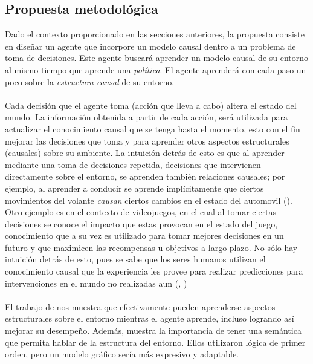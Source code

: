 \documentclass[11pt]{article}
\theoremstyle{plain}
\begin{document}
\subsection{Propuesta metodológica}
Dado el contexto proporcionado en las secciones anteriores, la propuesta consiste en diseñar un agente que incorpore un modelo causal dentro a un problema de toma de decisiones. Este agente buscará aprender un modelo causal de su entorno al mismo tiempo que aprende una \textit{política}. El agente aprenderá con cada paso un poco sobre la \textit{estructura causal} de su entorno.\\
\\
Cada decisión que el agente toma (acción que lleva a cabo) altera el estado del mundo. La información obtenida a partir de cada acción, será utilizada para actualizar el conocimiento causal que se tenga hasta el momento, esto con el fin mejorar las decisiones que toma y para aprender otros aspectos estructurales (causales) sobre su ambiente. La intuición detrás de esto es que al aprender mediante una toma de decisiones repetida, decisiones que intervienen directamente sobre el entorno, se aprenden también relaciones causales; por ejemplo, al aprender a conducir se aprende implícitamente que ciertos movimientos del volante \textit{causan} ciertos cambios en el estado del automovil (\cite{danks2014unifying}). Otro ejemplo es en el contexto de videojuegos, en el cual al tomar ciertas decisiones se conoce el impacto que estas provocan en el estado del juego, conocimiento que a su vez es utilizado para tomar mejores decisiones en un futuro y que maximicen las recompensas u objetivos a largo plazo. No sólo hay intuición detrás de esto, pues se sabe que los seres humanos utilizan el conocimiento causal que la experiencia les provee para realizar predicciones para intervenciones en el mundo no realizadas aun (\cite{meder2008inferring}, \cite{hagmayer2009decision})\\
\\
El trabajo de \cite{garnelo2016towards} nos muestra que efectivamente pueden aprenderse aspectos estructurales sobre el entorno mientras el agente aprende, incluso logrando así mejorar su desempeño. Además, muestra la importancia de tener una semántica que permita hablar de la estructura del entorno. Ellos utilizaron lógica de primer orden, pero un modelo gráfico sería más expresivo y adaptable.\\
\\
\end{document}
